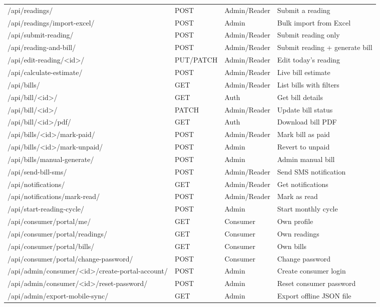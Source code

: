 \documentclass[12pt, a4paper]{report}
\begin{document}
\begin{longtable}{>{\ttfamily}p{} p{} p{} p{}}
/api/readings/ & POST & Admin/Reader & Submit a reading \\
/api/readings/import-excel/ & POST & Admin & Bulk import from Excel \\
/api/submit-reading/ & POST & Admin/Reader & Submit reading only \\
/api/reading-and-bill/ & POST & Admin/Reader & Submit reading + generate bill \\
/api/edit-reading/<id>/ & PUT/PATCH & Admin/Reader & Edit today's reading \\
/api/calculate-estimate/ & POST & Admin/Reader & Live bill estimate \\
\midrule
/api/bills/ & GET & Admin/Reader & List bills with filters \\
/api/bill/<id>/ & GET & Auth & Get bill details \\
/api/bill/<id>/ & PATCH & Admin/Reader & Update bill status \\
/api/bill/<id>/pdf/ & GET & Auth & Download bill PDF \\
/api/bills/<id>/mark-paid/ & POST & Admin/Reader & Mark bill as paid \\
/api/bills/<id>/mark-unpaid/ & POST & Admin & Revert to unpaid \\
/api/bills/manual-generate/ & POST & Admin & Admin manual bill \\
/api/send-bill-sms/ & POST & Admin/Reader & Send SMS notification \\
\midrule
/api/notifications/ & GET & Admin/Reader & Get notifications \\
/api/notifications/mark-read/ & POST & Admin/Reader & Mark as read \\
/api/start-reading-cycle/ & POST & Admin & Start monthly cycle \\
\midrule
/api/consumer/portal/me/ & GET & Consumer & Own profile \\
/api/consumer/portal/readings/ & GET & Consumer & Own readings \\
/api/consumer/portal/bills/ & GET & Consumer & Own bills \\
/api/consumer/portal/change-password/ & POST & Consumer & Change password \\
\midrule
/api/admin/consumer/<id>/create-portal-account/ & POST & Admin & Create consumer login \\
/api/admin/consumer/<id>/reset-password/ & POST & Admin & Reset consumer password \\
/api/admin/export-mobile-sync/ & GET & Admin & Export offline JSON file \\

\end{longtable}
\end{document}
